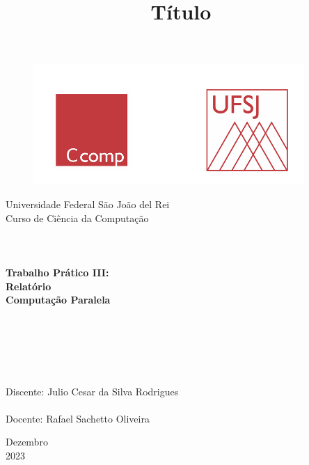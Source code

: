 \documentclass[a4paper, 12pt]{article}
\begin{document}

\begin{titlepage}
	\begin{center}
	
	\begin{figure}[ht]
    \centering
    \includegraphics[width=.44\textwidth]{Images/LogoUFSJ.PNG}
    \label{fig:Capturar.PNG}
    \end{figure}

    	\Huge{Universidade Federal São João del Rei}\\
		\Large{Curso de Ciência da Computação}\\ 

        \vspace{90pt}
        \textbf{\LARGE{
        \\
        \\
        \\
        Trabalho Prático III:\\
        Relatório\\
        \vspace{0.5cm}
        \Large{Computação Paralela}
        \\
        \\
        \\
        }}
        
		\title{{\large{Título}}}
		\vspace{1.5cm}
	\end{center}
	    
    \begin{flushleft}
		\begin{tabbing}
		\\
		\\
		\\	
		\large{Discente: Julio Cesar da Silva Rodrigues}\\
	    \\
		\large{Docente: Rafael Sachetto Oliveira}\\
	    \end{tabbing}
    \end{flushleft}
	\vspace{1cm}
	
	\begin{center}
		\vspace{\fill}
			Dezembro\\
		    2023
	\end{center}
\end{titlepage}
\end{document}
